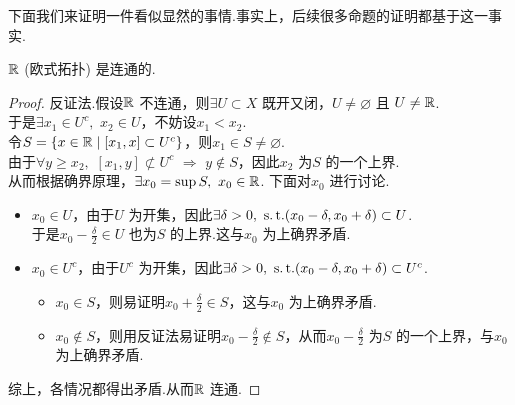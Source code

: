 	\vspace*{2em}
	下面我们来证明一件看似显然的事情.事实上，后续很多命题的证明都基于这一事实.
	\begin{proposition}\label{prop 2.3.2}
		$\mathbb{R}$ (欧式拓扑) 是连通的.
		
		\vspace*{2em}
		\begin{proof}
			反证法.假设$\mathbb{R}$ 不连通，则$\exists U \subset X$ 既开又闭，$U \neq \varnothing$ 且 $U \neq \mathbb{R}$.\\
			于是$\exists x_1 \in U^c , \,\, x_2 \in U$，不妨设$x_1 < x_2$.\\
			令$S = \{ x \in \mathbb{R} \mid [x_1 , x] \subset U^c \}$，则$x_1 \in S \neq \varnothing$.\\
			由于$\forall y \geq x_2 , \,\, [x_1 , y] \not\subset U^c \,\, \Rightarrow \,\, y \notin S$，因此$x_2$ 为$S$ 的一个上界.\\
			从而根据确界原理，$\exists x_0 = \sup{S} , \,\, x_0 \in \mathbb{R}$. 下面对$x_0$ 进行讨论.
			\begin{itemize}
				\item $x_0 \in U$，由于$U$ 为开集，因此$\exists \delta > 0 , \,\, \operatorname{s.t.} (x_0 - \delta , x_0 + \delta) \subset U$. \\
				于是$x_0 - \frac{\delta}{2} \in U$ 也为$S$ 的上界.这与$x_0$ 为上确界矛盾.
				
				\item $x_0 \in U^c$，由于$U^c$ 为开集，因此$\exists \delta > 0 , \,\, \operatorname{s.t.} (x_0 - \delta , x_0 + \delta) \subset U^c$.
				\begin{itemize}
					\item $x_0 \in S$，则易证明$x_0 + \frac{\delta}{2} \in S$，这与$x_0$ 为上确界矛盾.
					
					\item $x_0 \notin S$，则用反证法易证明$x_0 - \frac{\delta}{2} \notin S$，从而$x_0 - \frac{\delta}{2}$ 为$S$ 的一个上界，与$x_0$ 为上确界矛盾.
				\end{itemize}
			\end{itemize}
			综上，各情况都得出矛盾.从而$\mathbb{R}$ 连通.
		\end{proof}
	\end{proposition}
	
